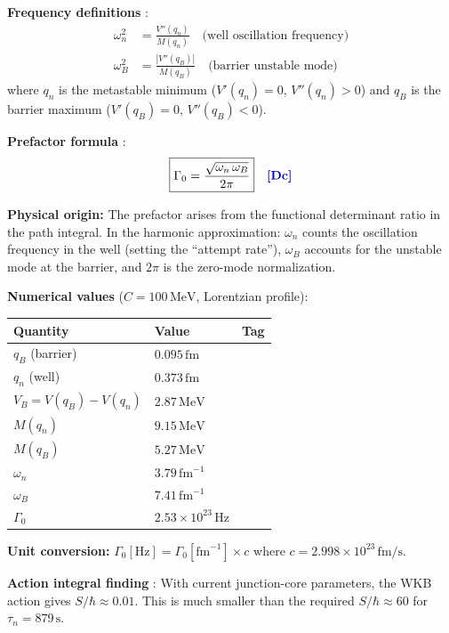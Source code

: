 \textbf{Frequency definitions} \tagDc{}:
\begin{align}
\omega_n^2 &= \frac{V''(q_n)}{M(q_n)} \quad \text{(well oscillation frequency)} \\
\omega_B^2 &= \frac{|V''(q_B)|}{M(q_B)} \quad \text{(barrier unstable mode)}
\end{align}
where $q_n$ is the metastable minimum ($V'(q_n) = 0$, $V''(q_n) > 0$) and $q_B$ is the
barrier maximum ($V'(q_B) = 0$, $V''(q_B) < 0$).

\textbf{Prefactor formula} \tagDc{}:
\begin{equation}
\boxed{\Gamma_0 = \frac{\sqrt{\omega_n \, \omega_B}}{2\pi}}
\quad \text{\tagDc{}}
\label{eq:Gamma0_prefactor}
\end{equation}

\textbf{Physical origin:} The prefactor arises from the functional determinant ratio
in the path integral. In the harmonic approximation: $\omega_n$ counts the oscillation
frequency in the well (setting the ``attempt rate''), $\omega_B$ accounts for the
unstable mode at the barrier, and $2\pi$ is the zero-mode normalization.

\textbf{Numerical values} ($C = 100\,\mathrm{MeV}$, Lorentzian profile):
\begin{center}
\small
\begin{tabular}{lll}
\toprule
\textbf{Quantity} & \textbf{Value} & \textbf{Tag} \\
\midrule
$q_B$ (barrier) & $0.095\,\mathrm{fm}$ & \tagDc{} \\
$q_n$ (well) & $0.373\,\mathrm{fm}$ & \tagDc{} \\
$V_B = V(q_B) - V(q_n)$ & $2.87\,\mathrm{MeV}$ & \tagDc{} \\
$M(q_n)$ & $9.15\,\mathrm{MeV}$ & \tagDc{} \\
$M(q_B)$ & $5.27\,\mathrm{MeV}$ & \tagDc{} \\
$\omega_n$ & $3.79\,\mathrm{fm}^{-1}$ & \tagDc{} \\
$\omega_B$ & $7.41\,\mathrm{fm}^{-1}$ & \tagDc{} \\
$\Gamma_0$ & $2.53 \times 10^{23}\,\mathrm{Hz}$ & \tagDc{} \\
\bottomrule
\end{tabular}
\end{center}

\textbf{Unit conversion:} $\Gamma_0 [\mathrm{Hz}] = \Gamma_0 [\mathrm{fm}^{-1}] \times c$
where $c = 2.998 \times 10^{23}\,\mathrm{fm/s}$.

\textbf{Action integral finding} \tagDc{}:
With current junction-core parameters, the WKB action gives $S/\hbar \approx 0.01$.
This is much smaller than the required $S/\hbar \approx 60$ for $\tau_n = 879\,\mathrm{s}$.

